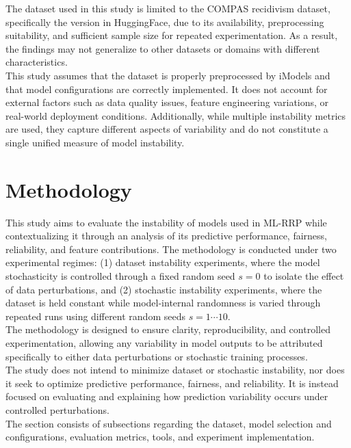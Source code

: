 \documentclass[12pt]{article}
\begin{document}
The dataset used in this study is limited to the COMPAS recidivism dataset, specifically the version in HuggingFace, due to its availability, preprocessing suitability, and sufficient sample size for repeated experimentation. As a result, the findings may not generalize to other datasets or domains with different characteristics.\\

This study assumes that the dataset is properly preprocessed by iModels and that model configurations are correctly implemented. It does not account for external factors such as data quality issues, feature engineering variations, or real-world deployment conditions. Additionally, while multiple instability metrics are used, they capture different aspects of variability and do not constitute a single unified measure of model instability.

\section{Methodology}
\tabto{2em} This study aims to evaluate the instability of models used in ML-RRP while contextualizing it through an analysis of its predictive performance, fairness, reliability, and feature contributions. The methodology is conducted under two experimental regimes: (1) dataset instability experiments, where the model stochasticity is controlled through a fixed random seed $s = 0 $ to isolate the effect of data perturbations, and (2) stochastic instability experiments, where the dataset is held constant while model-internal randomness is varied through repeated runs using different random seeds  $ s = 1 \cdots 10 $. \\

The methodology is designed to ensure clarity, reproducibility, and controlled experimentation, allowing any variability in model outputs to be attributed specifically to either data perturbations or stochastic training processes. \\

The study does not intend to minimize dataset or stochastic instability, nor does it seek to optimize predictive performance, fairness, and reliability. It is instead focused on evaluating and explaining how prediction variability occurs under controlled perturbations. \\

The section consists of subsections regarding the dataset, model selection and configurations, evaluation metrics, tools, and experiment implementation.
\end{document}
